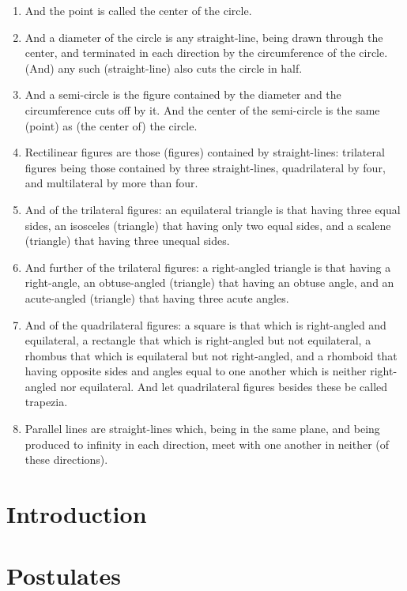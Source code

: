 \begin{enumerate}
    \item \label{def:16} And the point is called the center of the circle.
    \item \label{def:17} And a diameter of the circle is any straight-line, being drawn through the center, and terminated in each direction by the circumference of the circle. (And) any such (straight-line) also cuts the circle in half.
    \item \label{def:18} And a semi-circle is the figure contained by the diameter and the circumference cuts off by it. And the center of the semi-circle is the same (point) as (the center of) the circle.
    \item \label{def:19} Rectilinear figures are those (figures) contained by straight-lines: trilateral figures being those contained by three straight-lines, quadrilateral by four, and multilateral by more than four.
    \item \label{def:20} And of the trilateral figures: an equilateral triangle is that having three equal sides, an isosceles (triangle) that having only two equal sides, and a scalene (triangle) that having three unequal sides.
    \item \label{def:21} And further of the trilateral figures: a right-angled triangle is that having a right-angle, an obtuse-angled (triangle) that having an obtuse angle, and an acute-angled (triangle) that having three acute angles.
    \item \label{def:22} And of the quadrilateral figures: a square is that which is right-angled and equilateral, a rectangle that which is right-angled but not equilateral, a rhombus that which is equilateral but not right-angled, and a rhomboid that having opposite sides and angles equal to one another which is neither right-angled nor equilateral. And let quadrilateral figures besides these be called trapezia.
    \item \label{def:23} Parallel lines are straight-lines which, being in the same plane, and being produced to infinity in each direction, meet with one another in neither (of these directions).
\end{enumerate}

\chapter{Introduction}

\chapter{Postulates}

